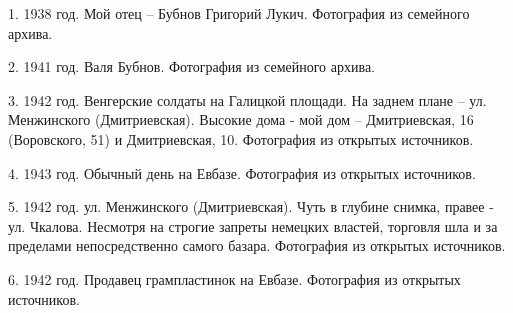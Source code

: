 1. 1938 год. Мой отец – Бубнов Григорий Лукич. Фотография из семейного архива.

2. 1941 год. Валя Бубнов. Фотография из семейного архива.

3. 1942 год. Венгерские солдаты на Галицкой площади. На заднем плане – ул.
Менжинского (Дмитриевская). Высокие дома - мой дом – Дмитриевская, 16
(Воровского, 51) и Дмитриевская, 10. Фотография из открытых источников.

4. 1943 год. Обычный день на Евбазе. Фотография из открытых источников.

5. 1942 год. ул. Менжинского (Дмитриевская). Чуть в глубине снимка, правее -
ул. Чкалова. Несмотря на строгие запреты немецких властей, торговля шла и за
пределами непосредственно самого базара. Фотография из открытых источников.

6. 1942 год. Продавец грампластинок на Евбазе. Фотография из открытых
источников.

